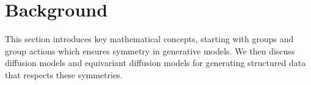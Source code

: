 

\section{Background}

This section introduces key mathematical concepts, starting with groups and group actions which ensures symmetry in generative models. We then discuss diffusion models and equivariant diffusion models for generating structured data that respects these symmetries.






